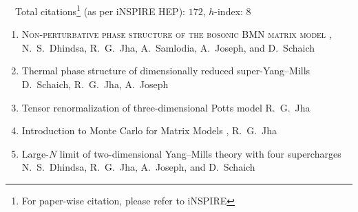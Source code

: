  {\faLeanpub}
~~Total citations\footnote{For paper-wise citation, please refer to iNSPIRE} (as per iNSPIRE HEP): $172$, $h$-index: $8$
\begin{enumerate}
\item \textsc{Non-perturbative phase structure of the bosonic BMN matrix model}  \newline 
\hfill  {},    \newline 	
N.~S.~Dhindsa, R.~G.~Jha, A.~Samlodia, A.~Joseph, and D.~Schaich
\vspace{1mm} 
\item Thermal phase structure of dimensionally reduced super-Yang--Mills \newline 
{} \newline 
D.~Schaich, R.~G.~Jha, A.~Joseph
\vspace{1mm} 
\item Tensor renormalization of three-dimensional Potts model  \newline 
{} \newline 
R.~G.~Jha
\vspace{1mm} 
 \item Introduction to Monte Carlo for Matrix Models \newline 
{},  \newline  
 R.~G.~Jha
 \vspace{1mm} 
 \item Large-$N$ limit of two-dimensional Yang--Mills theory with four supercharges \newline 
{} \newline 
 N.~S.~Dhindsa, R.~G.~Jha, A.~Joseph, and D.~Schaich
 \vspace{1mm}  

\end{enumerate}

